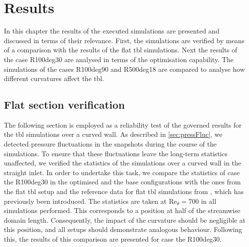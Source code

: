 \chapter{Results} \label{chap:results}


In this chapter the results of the executed simulations are presented and discussed in terms of their relevance.
First, the simulations are verified by means of a comparison with the results of the flat \acrshort{tbl} simulations.
Next the results of the case R100deg30 are analysed in terms of the optimisation capability.
The simulations of the cases R100deg90 and R500deg18 are compared to analyse how different curvatures affect the \acrshort{tbl}.


\section{Flat section verification}\label{sec:flatTBLVerif}
The following section is employed as a reliability test of the governed results for the \acrshort{tbl} simulations over a curved wall.
As described in \autoref{sec:pressFluc}, we detected pressure fluctuations in the snapshots during the course of the simulations.
To ensure that these fluctuations leave the long-term statistics unaffected, we verified the statistics of the simulations over a curved wall in the straight inlet.
In order to undertake this task, we compare the statistics of case the R100deg30 in the optimised and the base configurations with the ones from the flat \acrshort{tbl} setup and the reference data for flat \acrshort{tbl} simulations from \citet{schlatter_assessment_2010}, which has previously been introduced.
The statistics are taken at $\mathrm{Re}_{\theta} = 700$ in all simulations performed. This corresponds to a position at half of the streamwise domain length.
Consequently, the impact of the curvature should be negligible at this position, and all setups should demonstrate analogous behaviour.
Following this, the results of this comparison are presented for case the R100deg30. 

